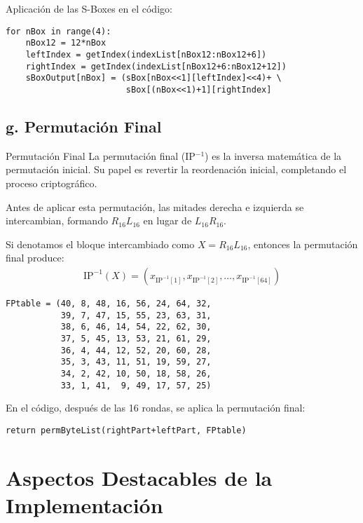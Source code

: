 Aplicación de las S-Boxes en el código:

\begin{lstlisting}[style=cryptoalgo]
for nBox in range(4):
    nBox12 = 12*nBox
    leftIndex = getIndex(indexList[nBox12:nBox12+6])
    rightIndex = getIndex(indexList[nBox12+6:nBox12+12])
    sBoxOutput[nBox] = (sBox[nBox<<1][leftIndex]<<4)+ \
                        sBox[(nBox<<1)+1][rightIndex]
\end{lstlisting}

\subsection{g. Permutación Final}

\begin{cryptomethod}{Permutación Final}
La permutación final (IP$^{-1}$) es la inversa matemática de la permutación inicial. Su papel es revertir la reordenación inicial, completando el proceso criptográfico.

Antes de aplicar esta permutación, las mitades derecha e izquierda se intercambian, formando $R_{16}L_{16}$ en lugar de $L_{16}R_{16}$.

Si denotamos el bloque intercambiado como $X = R_{16}L_{16}$, entonces la permutación final produce:
\begin{align}
\text{IP}^{-1}(X) = (x_{\text{IP}^{-1}[1]}, x_{\text{IP}^{-1}[2]}, \ldots, x_{\text{IP}^{-1}[64]})
\end{align}
\end{cryptomethod}

\begin{lstlisting}[style=cryptoalgo, caption={Tabla de Permutación Final}, label=lst:permutacion-final]
FPtable = (40, 8, 48, 16, 56, 24, 64, 32,
           39, 7, 47, 15, 55, 23, 63, 31,
           38, 6, 46, 14, 54, 22, 62, 30,
           37, 5, 45, 13, 53, 21, 61, 29,
           36, 4, 44, 12, 52, 20, 60, 28,
           35, 3, 43, 11, 51, 19, 59, 27,
           34, 2, 42, 10, 50, 18, 58, 26,
           33, 1, 41,  9, 49, 17, 57, 25)
\end{lstlisting}

En el código, después de las 16 rondas, se aplica la permutación final:

\begin{lstlisting}[style=cryptoalgo]
return permByteList(rightPart+leftPart, FPtable)
\end{lstlisting}

\section{Aspectos Destacables de la Implementación}


